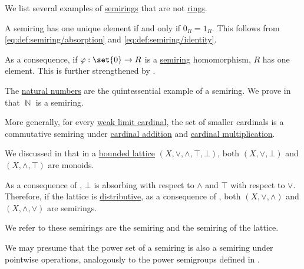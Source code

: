 \begin{example}\label{ex:def:semiring}
  We list several examples of \hyperref[def:semiring]{semirings} that are not \hyperref[def:ring]{rings}.

  \begin{thmenum}
     A semiring has one unique element if and only if \( 0_R = 1_R \). This follows from \eqref{eq:def:semiring/absorption} and \eqref{eq:def:semiring/identity}.

    As a consequence, if \( \varphi: \set{ 0 } \to R \) is a \hyperref[def:semiring/homomorphism]{semiring} homomorphism, \( R \) has one element. This is further strengthened by .

     The \hyperref[def:natural_numbers]{natural numbers} are the quintessential example of a semiring. We prove in  that \( \BbbN \) is a semiring.

     More generally, for every \hyperref[def:successor_and_limit_cardinal/weak_limit]{weak limit cardinal}, the set of smaller cardinals is a commutative semiring under \hyperref[def:cardinal_arithmetic/addition]{cardinal addition} and \hyperref[def:cardinal_arithmetic/multiplication]{cardinal multiplication}.

     We discussed in  that in a \hyperref[def:semilattice/bounded]{bounded lattice} \( (X, \vee, \wedge, \top, \bot) \), both \( (X, \vee, \bot) \) and \( (X, \wedge, \top) \) are monoids.

    As a consequence of , \( \bot \) is absorbing with respect to \( \wedge \) and \( \top \) with respect to \( \vee \). Therefore, if the lattice is \hyperref[def:semilattice/distributive_lattice]{distributive}, as a consequence of , both \( (X, \vee, \wedge) \) and \( (X, \wedge, \vee) \) are semirings.

    We refer to these semirings are the  semiring and the  semiring of the lattice.

     We may presume that the power set of a semiring is also a semiring under pointwise operations, analogously to the power semigroups defined in .


\end{thmenum}
\end{example}
